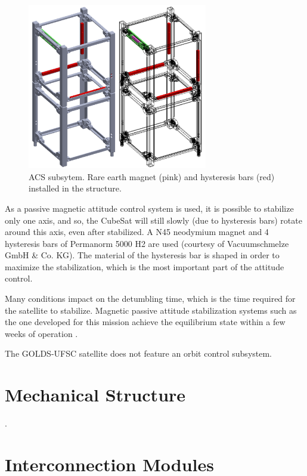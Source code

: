 \begin{figure}[!ht]
    \begin{center}
        \includegraphics[width=0.7\textwidth]{figures/adcs}
        \caption{ACS subsytem. Rare earth magnet (pink) and hysteresis bars (red) installed in the structure.}
        \label{fig:adcs}
    \end{center}
\end{figure}

As a passive magnetic attitude control system is used, it is possible to stabilize only one axis, and so, the CubeSat will still slowly (due to hysteresis bars) rotate around this axis, even after stabilized. A N45 neodymium magnet and 4 hysteresis bars of Permanorm 5000 H2 are used (courtesy of Vacuumschmelze GmbH \& Co. KG). The material of the hysteresis bar is shaped in order to maximize the stabilization, which is the most important part of the attitude control.

Many conditions impact on the detumbling time, which is the time required for the satellite to stabilize. Magnetic passive attitude stabilization systems such as the one developed for this mission achieve the equilibrium state within a few weeks of operation \cite{santoni2009}.

The GOLDS-UFSC satellite does not feature an orbit control subsystem.

\section{Mechanical Structure}

.

\section{Interconnection Modules}

